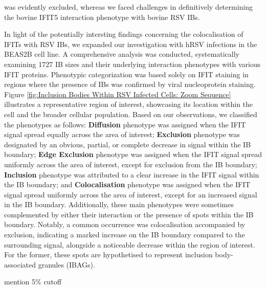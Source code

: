 was evidently excluded, whereas we faced challenges in definitively determining the bovine IFIT5 interaction phenotype with bovine RSV IBs.

In light of the potentially intersting findings concerning the colocalisation of IFITs with RSV IBs, we expanded our investigation with hRSV infections in the BEAS2B cell line. A comprehensive analysis was conducted, systematically examining 1727 IB sizes and their underlying interaction phenotypes with various IFIT proteins. Phenotypic categorization was based solely on IFIT staining in regions where the presence of IBs was confirmed by viral nucleoprotein staining. Figure \ref{fig:Inclusion Bodies Within RSV Infected Cells: Zoom Sequence} illustrates a representative region of interest, showcasing its location within the cell and the broader cellular population. Based on our observations, we classified the phenotypes as follows: \textbf{Diffusion} phenotype was assigned when the IFIT signal spread equally across the area of interest; \textbf{Exclusion} phenotype was designated by an obvious, partial, or complete decrease in signal within the IB boundary; \textbf{Edge Exclusion} phenotype was assigned when the IFIT signal spread uniformly across the area of interest, except for exclusion from the IB boundary; \textbf{Inclusion} phenotype was attributed to a clear increase in the IFIT signal within the IB boundary; and \textbf{Colocalisation} phenotype was assigned when the IFIT signal spread uniformly across the area of interest, except for an increased signal in the IB boundary. Additionally, these main phenotypes were sometimes complemented by either their interaction or the presence of spots within the IB boundary. Notably, a common occurrence was colocalisation accompanied by exclusion, indicating a marked increase on the IB boundary compared to the surrounding signal, alongside a noticeable decrease within the region of interest. For the former, these spots are hypothetised to represent inclusion body-associated granules (IBAGs).

mention 5\% cutoff

